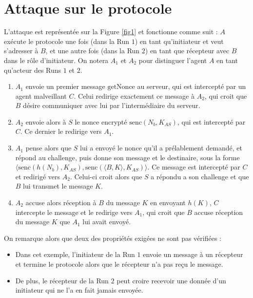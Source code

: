 \documentclass[a4paper,10pt]{article}
\begin{document}
\section{Attaque sur le protocole}
L'attaque est représentée sur la Figure \ref{fig1} et fonctionne comme suit : $A$ exécute le protocole une fois (dans la Run $1$) en tant qu'initiateur et veut s'adresser à $B$, et une autre fois (dans la Run $2$) en tant que récepteur avec $B$ dans le rôle d'initiateur. On notera $A_1$ et $A_2$ pour distinguer l'agent $A$ en tant qu'acteur des Runs $1$ et $2$.\\
\begin{enumerate}
\item $A_1$ envoie un premier message $\textrm{getNonce}$ au serveur, qui est intercepté par un agent malveillant $C$. Celui redirige exactement ce message à $A_2$, qui croit que $B$ désire communiquer avec lui par l'intermédiaire du serveur.
\item $A_2$ envoie alors à $S$ le nonce encrypté $\textrm{senc}(N_b,K_{AS})$, qui est intercepté par $C$. Ce dernier le redirige vers $A_1$.
\item $A_1$ pense alors que $S$ lui a envoyé le nonce qu'il a prélablement demandé, et répond au challenge, puis donne son message et le destinaire, sous la forme $\langle \textrm{senc}(h(N_b),K_{AS}),  \textrm{senc}(\langle B, K \rangle,K_{AS})\rangle$. Ce message est intercepté par $C$ et redirigé vers $A_2$. Celui-ci croit alors que $S$ a répondu a son challenge et que $B$ lui transmet le message $K$.
\item $A_2$ accuse alors réception à $B$ du message $K$ en envoyant $h(K)$, $C$ intercepte le message et le redirige vers $A_1$, qui croit que $B$ accuse réception du message $K$ que $A_1$ lui avait envoyé.
\end{enumerate}

On remarque alors que deux des propriétés exigées ne sont pas vérifiées :
\begin{itemize}
\item Dans cet exemple, l'initiateur de la Run $1$ envoie un message à un récepteur et termine le protocole alors que le récepteur n'a pas reçu le message. 
\item De plus, le récepteur de la Run $2$ peut croire recevoir une donnée d'un initiateur qui ne l'a en fait jamais envoyée.
\end{itemize}



\end{document}

